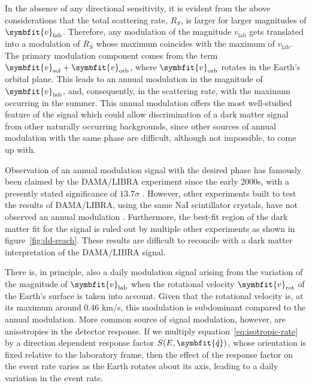 \documentclass[b5paper, 10pt, twoside]{book}
\renewcommand{\vec}[1]{\symbfit{#1}}
\newcommand{\unitv}[1]{\symbfit{\hat{#1}}}
\begin{document}
In the absence of any directional sensitivity, it is evident from the above considerations that the total scattering rate, $R_S$, is larger for larger magnitudes of $\vec{v}_\text{lab}$. Therefore, any modulation of the magnitude $v_\text{lab}$ gets translated into a modulation of $R_S$ whose maximum coincides with the maximum of $v_\text{lab}$. The primary modulation component comes from the term $\vec{v}_\text{sol}+\vec{v}_\text{orb}$, where $\vec{v}_\text{orb}$ rotates in the Earth's orbital plane. This leads to an annual modulation in the magnitude of $\vec{v}_\text{lab}$, and, consequently, in the scattering rate, with the maximum occurring in the summer. This annual modulation offers the most well-studied feature of the signal which could allow discrimination of a dark matter signal from other naturally occurring backgrounds, since other sources of annual modulation with the same phase are difficult, although not impossible, to come up with.

Observation of an annual modulation signal with the desired phase has famously been claimed by the DAMA/LIBRA experiment since the early 2000s, with a presently stated significance of $13.7\sigma$ \parencite{BernabeiEtAl2023}. However, other experiments built to test the results of DAMA/LIBRA, using the same NaI scintillator crystals, have not observed an annual modulation \parencites{DMIce2017, COSINE1002019, COSINE1002024, KIMS2019, ANAIS2024}. Furthermore, the best-fit region of the dark matter fit for the signal is ruled out by multiple other experiments as shown in figure~\ref{fig:dd-reach}.  These results are difficult to reconcile with a dark matter interpretation of the DAMA/LIBRA signal.

There is, in principle, also a daily modulation signal arising from the variation of the magnitude of $\vec{v}_\text{lab}$ when the rotational velocity $\vec{v}_\text{rot}$ of the Earth's surface is taken into account. Given that the rotational velocity is, at its maximum around 0.46 km/s, this modulation is subdominant compared to the annual modulation. More common source of signal modulation, however, are anisotropies in the detector response. If we multiply equation~\eqref{eq:isotropic-rate} by a direction dependent response factor $S(E,\unitv{q})$, whose orientation is fixed relative to the laboratory frame, then the effect of the response factor on the event rate varies as the Earth rotates about its axis, leading to a daily variation in the event rate.
\end{document}
